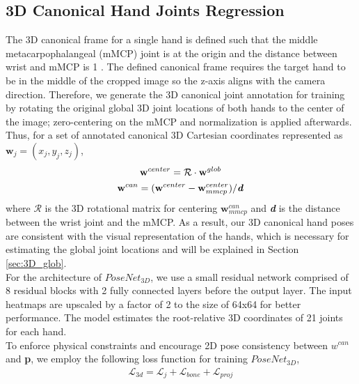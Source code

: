 \documentclass[10pt,twocolumn,letterpaper]{article}
\begin{document}
\subsection{3D Canonical Hand Joints Regression}\label{sec:3d_can}
\indent The 3D canonical frame for a single hand is defined such that the middle metacarpophalangeal (mMCP) joint is at the origin and the distance between wrist and mMCP is 1 \cite{Mueller}. The defined canonical frame requires the target hand to be in the middle of the cropped image so the z-axis aligns with the camera direction. Therefore, we generate the 3D canonical joint annotation for training by rotating the original global 3D joint locations of both hands to the center of the image; zero-centering on the mMCP and normalization is applied afterwards. Thus, for a set of annotated canonical 3D Cartesian coordinates represented as $\textbf{w}_{j} = (\textit{x}_{j}, \textit{y}_{j}, \textit{z}_{j})$, \\
\begin{equation}\label{eq:3d_canonical}
\begin{gathered}
\textbf{w}^{center} = \mathcal{R}\cdot\textbf{w}^{glob}\\
\textbf{w}^{can} = (\textbf{w}^{center} - \textbf{w}^{center}_{mmcp}) / \textbf{\textit{d}}
\end{gathered}
\end{equation}
where $\mathcal{R}$ is the 3D rotational matrix for centering $\textbf{w}^{can}_{mmcp}$ and \textbf{\textit{d}} is the distance between the wrist joint and the mMCP. As a result, our 3D canonical hand poses are consistent with the visual representation of the hands, which is necessary for estimating the global joint locations and will be explained in Section \ref{sec:3D_glob}.\\
\indent For the architecture of \textit{$PoseNet_{3D}$}, we use a small residual network comprised of 8 residual blocks with 2 fully connected layers before the output layer. The input heatmaps are upscaled by a factor of 2 to the size of 64x64 for better performance. The model estimates the root-relative 3D coordinates of 21 joints for each hand.\\
\indent To enforce physical constraints and encourage 2D pose consistency between $\textit{w}^{can}$ and \textbf{p}, we employ the following loss function for training \textit{$PoseNet_{3D}$}, \\
\begin{equation}\label{eq:3d_loss}
\begin{gathered}
\mathcal{L}_{3d} = \mathcal{L}_{j} + \mathcal{L}_{bone} + \mathcal{L}_{proj}\\
\end{gathered}
\end{equation}
\end{document}
